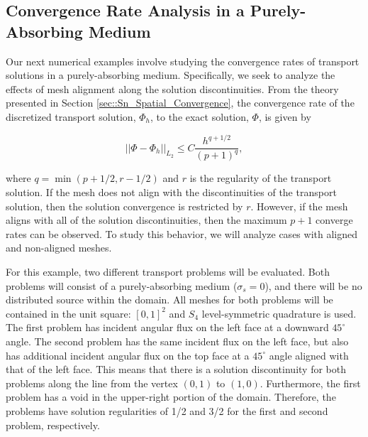 


\subsection{Convergence Rate Analysis in a Purely-Absorbing Medium}
\label{sec::BF_Results_PA}

Our next numerical examples involve studying the convergence rates of transport solutions in a purely-absorbing medium. Specifically, we seek to analyze the effects of mesh alignment along the solution discontinuities. From the theory presented in Section \ref{sec::Sn_Spatial_Convergence}, the convergence rate of the discretized transport solution, $\Phi_h$, to the exact solution, $\Phi$, is given by

\begin{equation}
\label{eq::BF_results_PA_conv}
|| \Phi - \Phi_{h} ||_{L_2}\leq C \frac{h^{q+1/2}}{(p+1)^q} ,
\end{equation}

\noindent where $q = \min (p+1/2, r - 1/2)$ and $r$ is the regularity of the transport solution. If the mesh does not align with the discontinuities of the transport solution, then the solution convergence is restricted by $r$. However, if the mesh aligns with all of the solution discontinuities, then the maximum $p+1$ converge rates can be observed. To study this behavior, we will analyze cases with aligned and non-aligned meshes.

For this example, two different transport problems will be evaluated. Both problems will consist of a purely-absorbing medium ($\sigma_s=0$), and there will be no distributed source within the domain. All meshes for both problems will be contained in the unit square: $[0,1]^2$ and $S_4$ level-symmetric quadrature is used. The first problem has incident angular flux on the left face at a downward $45^{\circ}$ angle. The second problem has the same incident flux on the left face, but also has additional incident angular flux on the top face at a $45^{\circ}$ angle aligned with that of the left face. This means that there is a solution discontinuity for both problems along the line from the vertex $(0,1)$ to $(1,0)$. Furthermore, the first problem has a void in the upper-right portion of the domain. Therefore, the problems have solution regularities of 1/2 and 3/2 for the first and second problem, respectively.

